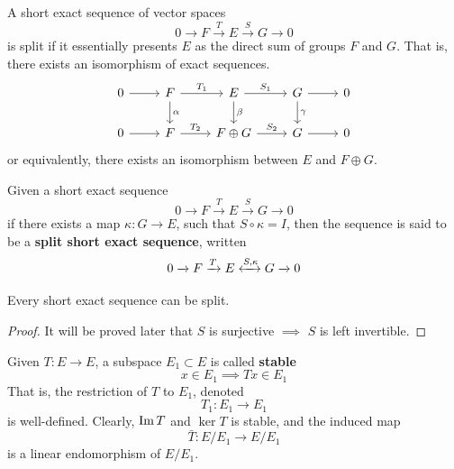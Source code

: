   \begin{theorem}
    A short exact sequence of vector spaces
    \begin{equation}
      0 \xrightarrow{} F \xrightarrow{T} E \xrightarrow{S} G \xrightarrow{} 0
    \end{equation}
    is split if it essentially presents $E$ as the direct sum of groups $F$ and $G$. That is, there exists an isomorphism of exact sequences.
    \[\begin{tikzcd}
        0 \arrow{r} & F \arrow{d}{\alpha} \arrow{r}{T_1} & E \arrow{d}{\beta} \arrow{r}{S_1} & G \arrow{d}{\gamma} \arrow{r} & 0 \\
        0 \arrow{r} & F \arrow{r}{T_2} & F \oplus G \arrow{r}{S_2} & G \arrow{r} & 0 
    \end{tikzcd}\]
    or equivalently, there exists an isomorphism between $E$ and $F \oplus G$. 
  \end{theorem}

  \begin{definition}
    Given a short exact sequence
    \begin{equation}
      0 \xrightarrow{} F \xrightarrow{T} E \xrightarrow{S} G \xrightarrow{} 0
    \end{equation}
    if there exists a map $\kappa: G \longrightarrow E$, such that $ S \circ \kappa = I$, then the sequence is said to be a \textbf{split short exact sequence}, written
    \begin{equation}
      0 \xrightarrow{} F \xrightarrow{T} E \xleftrightarrow{S, \kappa} G \xrightarrow{} 0
    \end{equation}
  \end{definition}

  \begin{theorem}
    Every short exact sequence can be split. 
  \end{theorem}
  \begin{proof}
    It will be proved later that $S$ is surjective $\implies$ $S$ is left invertible. 
  \end{proof}

  \begin{definition}
    Given $T: E \longrightarrow E$, a subspace $E_1 \subset E$ is called \textbf{stable} 
    \begin{equation}
      x \in E_1 \implies T x \in E_1
    \end{equation}
    That is, the restriction of $T$ to $E_1$, denoted
    \begin{equation}
      T_1: E_1 \longrightarrow E_1
    \end{equation}
    is well-defined. Clearly, $\operatorname{Im}{T}$ and $\ker{T}$ is stable, and the induced map 
    \begin{equation}
      \bar{T}: E / E_1 \longrightarrow E / E_1
    \end{equation}
    is a linear endomorphism of $E / E_1$. 
  \end{definition}

